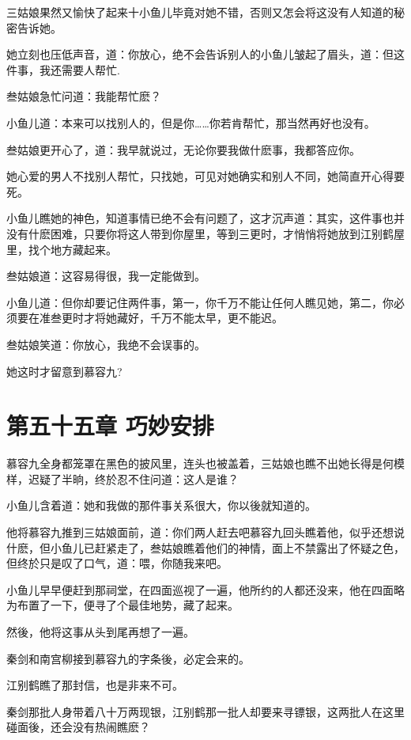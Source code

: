 \documentclass[12pt,oneside]{book}
\begin{document}
三姑娘果然又愉快了起来十小鱼儿毕竟对她不错，否则又怎会将这没有人知道的秘密告诉她。

她立刻也压低声音，道：你放心，绝不会告诉别人的小鱼儿皱起了眉头，道：但这件事，我还需要人帮忙.

叁姑娘急忙问道：我能帮忙麽？

小鱼儿道：本来可以找别人的，但是你\ldots\ldots 你若肯帮忙，那当然再好也没有。

叁姑娘更开心了，道：我早就说过，无论你要我做什麽事，我都答应你。

她心爱的男人不找别人帮忙，只找她，可见对她确实和别人不同，她简直开心得要死。

小鱼儿瞧她的神色，知道事情已绝不会有问题了，这才沉声道：其实，这件事也并没有什麽困难，只要你将这人带到你屋里，等到三更时，才悄悄将她放到江别鹤屋里，找个地方藏起来。

叁姑娘道：这容易得很，我一定能做到。

小鱼儿道：但你却要记住两件事，第一，你千万不能让任何人瞧见她，第二，你必须要在准叁更时才将她藏好，千万不能太早，更不能迟。

叁姑娘笑道：你放心，我绝不会误事的。

她这时才留意到慕容九?

\hypertarget{ux7b2cux4e94ux5341ux4e94ux7ae0-ux5de7ux5999ux5b89ux6392}{%
\chapter{第五十五章
巧妙安排}\label{ux7b2cux4e94ux5341ux4e94ux7ae0-ux5de7ux5999ux5b89ux6392}}

慕容九全身都笼罩在黑色的披风里，连头也被盖着，三姑娘也瞧不出她长得是何模样，迟疑了半晌，终於忍不住问道：这人是谁？

小鱼儿含着道：她和我做的那件事关系很大，你以後就知道的。

他将慕容九推到三姑娘面前，道：你们两人赶去吧慕容九回头瞧着他，似乎还想说什麽，但小鱼儿已赶紧走了，叁姑娘瞧着他们的神情，面上不禁露出了怀疑之色，但终於只是叹了口气，道：喂，你随我来吧。

小鱼儿早早便赶到那祠堂，在四面巡视了一遍，他所约的人都还没来，他在四面略为布置了一下，便寻了个最佳地势，藏了起来。

然後，他将这事从头到尾再想了一遍。

秦剑和南宫柳接到慕容九的字条後，必定会来的。

江别鹤瞧了那封信，也是非来不可。

秦剑那批人身带着八十万两现银，江别鹤那一批人却要来寻镖银，这两批人在这里碰面後，还会没有热闹瞧麽？
\end{document}
